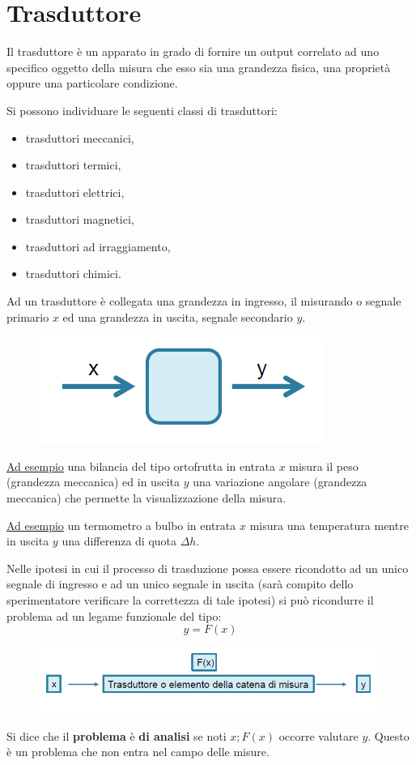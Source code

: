 \documentclass[a4paper, 15pt]{article}
\begin{document}
\section{Trasduttore}  
	\begin{adjustwidth}{2in}{}
		Il trasduttore è un apparato in grado di fornire un output correlato ad uno
	specifico oggetto della misura che esso sia una grandezza fisica, una
	proprietà oppure una particolare condizione. \newline 

	Si possono individuare le seguenti classi di trasduttori:
	\begin{itemize}
		\item trasduttori meccanici,
		\item trasduttori termici,
		\item trasduttori elettrici,
		\item trasduttori magnetici,
		\item trasduttori ad irraggiamento,
		\item trasduttori chimici.
	\end{itemize}

	Ad un trasduttore è collegata una grandezza in ingresso, il misurando o segnale primario $x$ ed una grandezza in uscita, segnale secondario $y$. 	
\begin{figure}[H]
	\centering
	\includegraphics[width=0.4\linewidth]{fig/screenshot004}
	\label{fig:screenshot004}
\end{figure}
	\underline{Ad esempio} una bilancia del tipo ortofrutta in entrata $x$ misura il peso (grandezza meccanica) ed in uscita $y$ una variazione angolare (grandezza meccanica) che permette la visualizzazione della misura. 
	
	\underline{Ad esempio} un termometro a bulbo in entrata $x$ misura una temperatura mentre in uscita $y$ una differenza di quota $\Delta h$. \newline 
	
	Nelle ipotesi in cui il processo di trasduzione possa essere ricondotto ad un
	unico segnale di ingresso e ad un unico segnale in uscita (sarà compito dello
	sperimentatore verificare la correttezza di tale ipotesi) si può ricondurre il problema ad un legame funzionale del tipo: 
	\[ y = F(x)\]	
\begin{figure}[H]
	\centering
	\includegraphics[width=0.5\linewidth]{fig/screenshot005}
	\label{fig:screenshot005}
\end{figure}
	Si dice che il \textbf{problema} è \textbf{di analisi} se noti $x; F(x)$ occorre valutare $y$. Questo è un problema che non entra nel campo delle misure. \newline 
	

\end{adjustwidth}
\end{document}
